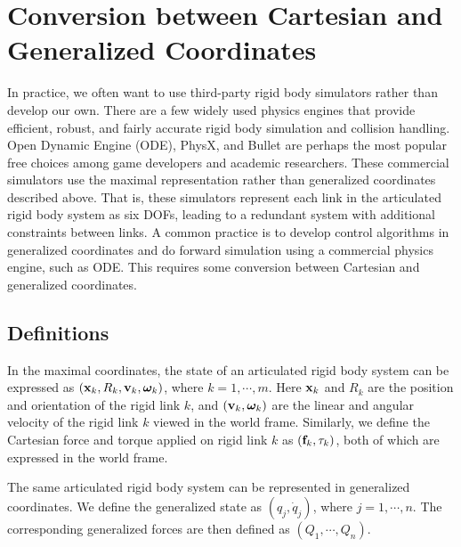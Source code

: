 \section{Conversion between Cartesian and Generalized Coordinates}
In practice, we often want to use third-party rigid body simulators
rather than develop our own. There are a few widely used physics
engines that provide efficient, robust, and fairly accurate rigid body
simulation and collision handling. Open Dynamic Engine (ODE), PhysX, and
Bullet are perhaps the most popular free choices among game developers and
academic researchers. These commercial simulators use the maximal
representation rather than generalized coordinates
described above. That is, these simulators represent each link in the
articulated rigid body system as six DOFs,
leading to a redundant system with additional constraints between
links. A common practice is to develop control algorithms in
generalized coordinates and do forward simulation using a commercial
physics engine, such as ODE. This requires some conversion between
Cartesian and generalized coordinates.

\subsection{Definitions}
In the maximal coordinates, the state of an articulated rigid body
system can be expressed as $(\mathbf{x}_k, R_k, \mathbf{v}_k,
\boldsymbol{\bm{\omega}}_k)$, where $k = 1, \cdots, m$. Here $\mathbf{x}_k$ and
$R_k$ are the position and orientation of the rigid link $k$, and $(\mathbf{v}_k,
\boldsymbol{\bm{\omega}}_k)$ are the linear and angular velocity of the
rigid link $k$ viewed in the world frame. Similarly, we define the
Cartesian force and torque applied on rigid link $k$ as $(\mathbf{f}_k,
{\tau}_k)$, both of which are expressed in the world
frame.

The same articulated rigid body system can be represented in
generalized coordinates. We define the generalized state as $(q_j,
\dot{q}_j)$, where $j = 1, \cdots, n$. The corresponding generalized
forces are then defined as $(Q_1, \cdots, Q_n)$.

